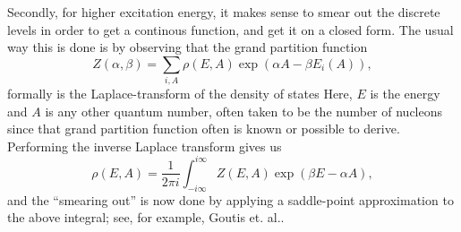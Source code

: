 Secondly, for higher excitation energy, it makes sense to smear out the discrete levels in order to get a continous function, and get it on a closed form. The usual way this is done is by observing that the grand partition function 
\begin{equation}
Z(\alpha,\beta) = \sum_{i,A} \rho(E,A) \exp{(\alpha A - \beta E_i(A))},
\end{equation}
formally is the Laplace-transform of the density of states
Here, $E$ is the energy and $A$ is any other quantum number, often taken to be the number of nucleons since that grand partition function often is known or possible to derive.
Performing the inverse Laplace transform gives us
\begin{equation}
\rho(E,A) = \frac{1}{2\pi i} \int_{-i\infty}^{i\infty} Z(E,A)\exp{(\beta E - \alpha A)},
\end{equation} 
and the ``smearing out'' is now done by applying a saddle-point approximation to the above integral; see, for example,  Goutis et. al.\cite{saddle1999}.

